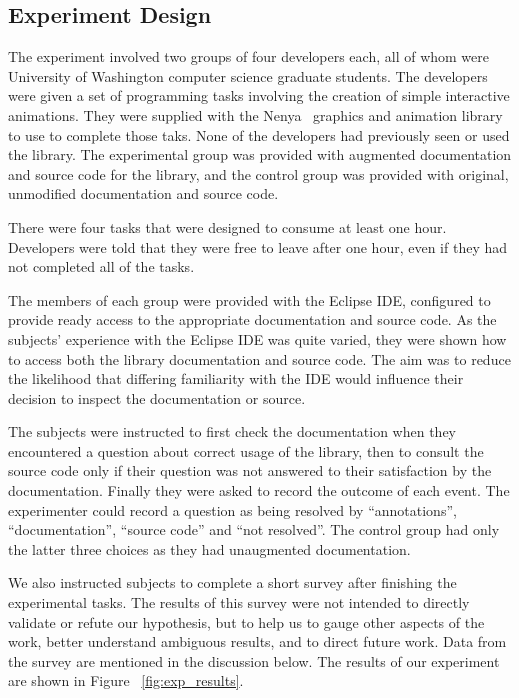 \subsection{Experiment Design}
The experiment involved two groups of four developers each, all of whom were
University of Washington computer science graduate students. The developers
were given a set of programming tasks involving the creation of simple
interactive animations. They were supplied with the Nenya~\cite{nenya} graphics
and animation library to use to complete those taks. None of the developers had
previously seen or used the library. The experimental group was provided with
augmented documentation and source code for the library, and the control group
was provided with original, unmodified documentation and source code.

There were four tasks that were designed to consume at least one
hour. Developers were told that they were free to leave after one hour, even if
they had not completed all of the tasks.

The members of each group were provided with the Eclipse IDE, configured to
provide ready access to the appropriate documentation and source code. As the
subjects' experience with the Eclipse IDE was quite varied, they were shown how
to access both the library documentation and source code. The aim was to reduce
the likelihood that differing familiarity with the IDE would influence their
decision to inspect the documentation or source.

The subjects were instructed to first check the documentation when they
encountered a question about correct usage of the library, then to consult the
source code only if their question was not answered to their satisfaction by
the documentation. Finally they were asked to record the outcome of each event.
The experimenter could record a question as being resolved by ``annotations'',
``documentation'', ``source code'' and ``not resolved''. The control group had
only the latter three choices as they had unaugmented documentation.

We also instructed subjects to complete a short survey after finishing the
experimental tasks. The results of this survey were not intended to directly
validate or refute our hypothesis, but to help us to gauge other aspects of the
work, better understand ambiguous results, and to direct future work. Data from
the survey are mentioned in the discussion below. The results of our experiment
are shown in Figure ~\ref{fig:exp_results}.

